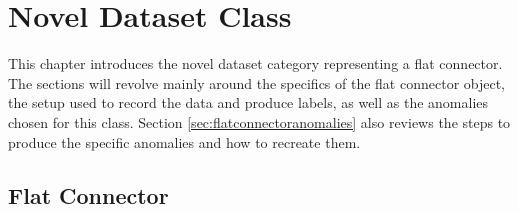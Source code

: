 \chapter{Novel Dataset Class}
\label{chap:datasets}

This chapter introduces the novel dataset category representing a flat connector. The sections will revolve mainly around the specifics of the flat connector object, the setup used to 
record the data and produce labels, as well as the anomalies chosen for this class. Section \ref{sec:flatconnectoranomalies} also reviews the steps to produce the specific anomalies 
and how to recreate them.


\section{Flat Connector}
\label{sec:faltconnectordesscription}

